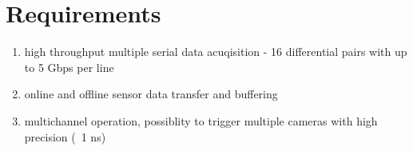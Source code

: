 
\chapter{Requirements}\label{ch2:req}

%

\begin{enumerate}
    \item high throughput multiple serial data acuqisition - 16 differential pairs with up to 5 Gbps per line
    \item online and offline sensor data transfer and buffering
    \item multichannel operation, possiblity to trigger multiple cameras with high precision (~1 ns)
\end{enumerate}


